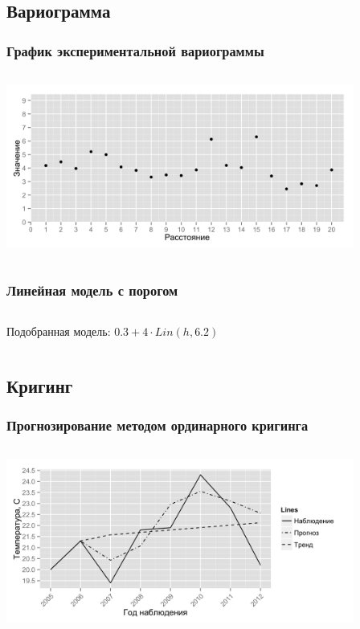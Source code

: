 \documentclass[10pt, ucs, pdf,aspectratio=169]{beamer}
\begin{document}
\subsection{Вариограмма}

\begin{frame}
  \frametitle{График экспериментальной вариограммы}   %
   \begin{columns}[c]
   \column{4.5in}
  \includegraphics[width=4.5in]{../../figures/variogram/lin-variogram.png}
  \end{columns}
\end{frame}

\begin{frame}
  \frametitle{Линейная модель с порогом}   %
  \begin{columns}[c]
  \column{2in}  %
  Подобранная модель: $ 0.3 + 4 \cdot Lin(h, 6.2) $
  \column{3in}
  \end{columns}
\end{frame}

\subsection{Кригинг}
\begin{frame}
  \frametitle{Прогнозирование методом ординарного кригинга}   %
   \begin{columns}[c]
   \column{4.5in}
   \includegraphics[width=4.5in]{../../figures/variogram/lin-fit-adapt-cross-prediction.png}
  \end{columns}
\end{frame}
\end{document}

